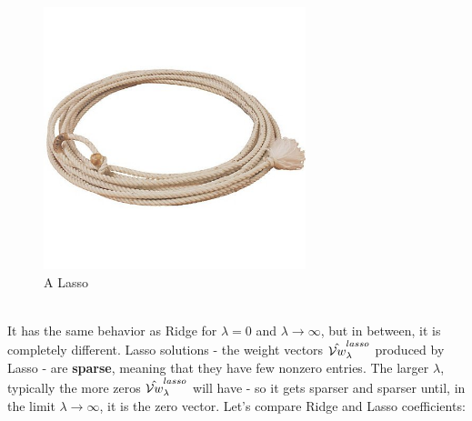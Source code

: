 \begin{figure}[H]
      \centering
      \includegraphics[width=3in]{lasso_rope.jpg}
      \caption{A Lasso}
    \end{figure}
~\\
    It has the same behavior as Ridge for $\lambda=0$ and $\lambda\to\infty$,
    but in between, it is completely different. Lasso solutions - the weight
    vectors $\hat{\mathcal{V}{w}}_\lambda^{lasso}$ produced by Lasso -  are {\bf
    sparse}, meaning that they have few nonzero entries. 
    The larger $\lambda$, typically the more zeros $\hat{\mathcal{V}{w}}_\lambda^{lasso}$
    will have - so it gets sparser and sparser until, in the limit
    $\lambda\to\infty$, it is the zero vector. 
    Let's compare Ridge and Lasso coefficients:
    

